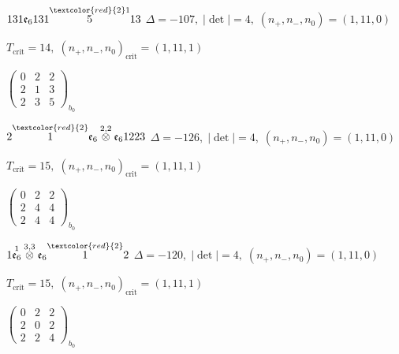 \documentclass[10pt]{article}
\begin{document}
\smallskip

$131\mathfrak{e}_6131\overset{\textcolor{red}{2}1}{5}13$ \quad $\Delta=-107,\; |\det|=4,\; (n_+,n_-,n_0)=(1,11,0)$

\hspace{1em}$T_{\text{crit}}=14,\; (n_+,n_-,n_0)_{\text{crit}}=(1,11,1)$

\hspace{2em}$\left(\begin{smallmatrix}0 & 2 & 2 \\ 2 & 1 & 3 \\ 2 & 3 & 5\end{smallmatrix}\right)_{\!b_0}$

\smallskip

$2\overset{\textcolor{red}{2}}{1}\mathfrak{e}_6\overset{2,2}{\otimes}\mathfrak{e}_61223$ \quad $\Delta=-126,\; |\det|=4,\; (n_+,n_-,n_0)=(1,11,0)$

\hspace{1em}$T_{\text{crit}}=15,\; (n_+,n_-,n_0)_{\text{crit}}=(1,11,1)$

\hspace{2em}$\left(\begin{smallmatrix}0 & 2 & 2 \\ 2 & 4 & 4 \\ 2 & 4 & 4\end{smallmatrix}\right)_{\!b_0}$

\smallskip

$1\overset{1}{\mathfrak{e}_6}\overset{3,3}{\otimes}\mathfrak{e}_6\overset{\textcolor{red}{2}}{1}2$ \quad $\Delta=-120,\; |\det|=4,\; (n_+,n_-,n_0)=(1,11,0)$

\hspace{1em}$T_{\text{crit}}=15,\; (n_+,n_-,n_0)_{\text{crit}}=(1,11,1)$

\hspace{2em}$\left(\begin{smallmatrix}0 & 2 & 2 \\ 2 & 0 & 2 \\ 2 & 2 & 4\end{smallmatrix}\right)_{\!b_0}$

\smallskip
\end{document}
